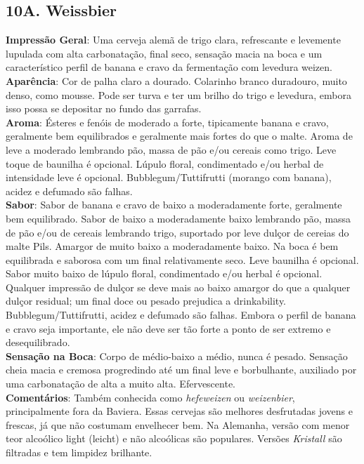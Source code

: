\subsection*{10A. Weissbier}
\textbf{Impressão Geral}: Uma cerveja alemã de trigo clara, refrescante e levemente lupulada com alta carbonatação, final seco, sensação macia na boca e um característico perfil de banana e cravo da fermentação com levedura weizen. \\
\textbf{Aparência}: Cor de palha claro a dourado. Colarinho branco duradouro, muito denso, como mousse. Pode ser turva e ter um brilho do trigo e levedura, embora isso possa se depositar no fundo das garrafas. \\
\textbf{Aroma}: Ésteres e fenóis de moderado a forte, tipicamente banana e cravo, geralmente bem equilibrados e geralmente mais fortes do que o malte. Aroma de leve a moderado lembrando pão, massa de pão e/ou cereais como trigo. Leve toque de baunilha é opcional. Lúpulo floral, condimentado e/ou herbal de intensidade leve é opcional. Bubblegum/Tuttifrutti (morango com banana), acidez e defumado são falhas. \\
\textbf{Sabor}: Sabor de banana e cravo de baixo a moderadamente forte, geralmente bem equilibrado. Sabor de baixo a moderadamente baixo lembrando pão, massa de pão e/ou de cereais lembrando trigo, suportado por leve dulçor de cereias do malte Pils. Amargor de muito baixo a moderadamente baixo. Na boca é bem equilibrada e saborosa com um final relativamente seco. Leve baunilha é opcional. Sabor muito baixo de lúpulo floral, condimentado e/ou herbal é opcional. Qualquer impressão de dulçor se deve mais ao baixo amargor do que a qualquer dulçor residual; um final doce ou pesado prejudica a drinkability. Bubblegum/Tuttifrutti, acidez e defumado são falhas. Embora o perfil de banana e cravo seja importante, ele não deve ser tão forte a ponto de ser extremo e desequilibrado. \\
\textbf{Sensação na Boca}: Corpo de médio-baixo a médio, nunca é pesado. Sensação cheia macia e cremosa progredindo até um final leve e borbulhante, auxiliado por uma carbonatação de alta a muito alta. Efervescente. \\
\textbf{Comentários}: Também conhecida como \textit{hefeweizen} ou \textit{weizenbier}, principalmente fora da Baviera. Essas cervejas são melhores desfrutadas jovens e frescas, já que não costumam envelhecer bem. Na Alemanha, versão com menor teor alcoólico light (leicht) e não alcoólicas são populares. Versões \textit{Kristall} são filtradas e tem limpidez brilhante. \\

